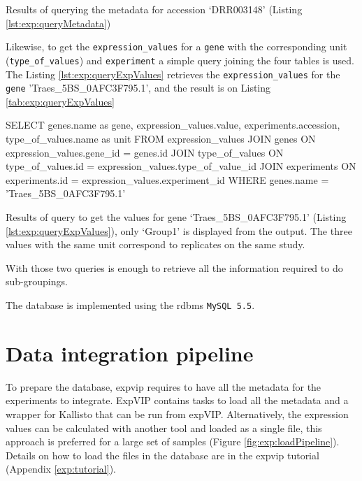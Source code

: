 \begin{table}[h]
\caption[Results of query for metadata]{Results of querying the metadata for accession `DRR003148' (Listing \ref{lst:exp:queryMetadata})}
\label{tab:exp:queryMetadata}

\end{table}

Likewise, to get the \texttt{expression\_values} for a \texttt{gene} with the corresponding unit (\texttt{type\_of\_values}) and \texttt{experiment} a simple query joining the four tables is used. 
The Listing \ref{lst:exp:queryExpValues} retrieves the \texttt{expression\_values} for the \texttt{gene} 'Traes\_5BS\_0AFC3F795.1', and the result is on Listing \ref{tab:exp:queryExpValues}

\begin{code}[language=sql, caption={[Query values for gene and experiment group] Query values from `Group1' and gene `Traes\_5BS\_0AFC3F795.1' },label=lst:exp:queryExpValues]
SELECT 
	genes.name as gene, 
	expression_values.value,
	experiments.accession,
	type_of_values.name as unit
FROM expression_values
JOIN genes 
	ON expression_values.gene_id = genes.id
JOIN type_of_values 
	ON type_of_values.id = expression_values.type_of_value_id
JOIN experiments 
	ON experiments.id = expression_values.experiment_id
WHERE 
	genes.name = 'Traes_5BS_0AFC3F795.1' 
\end{code}

\begin{table}[h]
\caption[Results of query for values]{Results of query to get the values for gene `Traes\_5BS\_0AFC3F795.1' (Listing \ref{lst:exp:queryExpValues}), only `Group1' is displayed from the output. The three values with the same unit correspond to replicates on the same study.}
\label{tab:exp:queryExpValues}
\centering

\end{table}

With those two queries is enough to retrieve all the information required to do sub-groupings. 

The database is implemented using the \acrshort{rdbms} \texttt{MySQL 5.5}. 



\section{Data integration pipeline} 
\label{exp:pipeline}


To prepare the database, \gls{expvip} requires to have all the metadata for the experiments to integrate. 
ExpVIP contains tasks to load all the metadata and a wrapper for Kallisto that can be run from expVIP. 
Alternatively, the expression values can be calculated with another tool and loaded as a single file, this approach is preferred for a large set of samples (Figure \ref{fig:exp:loadPipeline}). 
Details on how to load the files in the database are in the \gls{expvip} tutorial (Appendix \ref{exp:tutorial}). 


